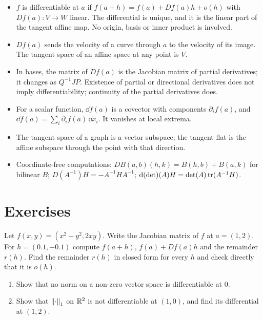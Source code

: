 \begin{notechapter}
\begin{chaptersummary}
\begin{itemize}[nosep]
  \item $f$ is differentiable at $a$ if
        $f(a + h) = f(a) + Df(a)h + o(h)$ with $Df(a):V\to W$ linear. The
        differential is unique, and it is the linear part of the tangent
        affine map. No origin, basis or inner product is involved.
  \item $Df(a)$ sends the velocity of a curve through $a$ to the velocity
        of its image. The tangent space of an affine space at any point is
        $V$.
  \item In bases, the matrix of $Df(a)$ is the Jacobian matrix of partial
        derivatives; it changes as $Q^{-1}JP$. Existence of partial or
        directional derivatives does not imply differentiability;
        continuity of the partial derivatives does.
  \item For a scalar function, $\dd f(a)$ is a covector with components
        $\partial_if(a)$, and $\dd f(a) = \sum_i\partial_if(a)\,\dd x_i$.
        It vanishes at local extrema.
  \item The tangent space of a graph is a vector subspace; the tangent
        flat is the affine subspace through the point with that
        direction.
  \item Coordinate-free computations: $DB(a, b)(h, k) = B(h, b) + B(a, k)$
        for bilinear $B$; $D(A^{-1})H = -A^{-1}HA^{-1}$;
        $\mathrm{d}(\det)(A)H = \det(A)\operatorname{tr}(A^{-1}H)$.
\end{itemize}
\end{chaptersummary}

\section*{Exercises}

\begin{exercise}\label{differential:exr:1}
Let $f(x, y) = (x^2 - y^2, 2xy)$. Write the Jacobian matrix of $f$ at
$a = (1, 2)$. For $h = (0.1, -0.1)$ compute $f(a + h)$,
$f(a) + Df(a)h$ and the remainder $r(h)$. Find the remainder $r(h)$ in
closed form for every $h$ and check directly that it is $o(h)$.
\end{exercise}

\begin{exercise}\label{differential:exr:2}
\begin{enumerate}[nosep]
  \item Show that no norm on a non-zero vector space is differentiable at
        $0$.
  \item Show that $\left\|\cdot\right\|_1$ on $\mathbb{R}^2$ is not differentiable at
        $(1, 0)$, and find its differential at $(1, 2)$.
\end{enumerate}
\end{exercise}


\end{notechapter}
